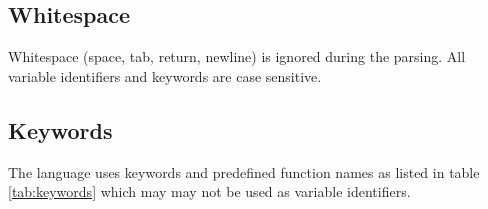 \ifdefined\STModuleDoc
\newcommand{\stsubsection}{\subsection}
\else
\newcommand{\stsubsection}{\subsection*}
\fi

\stsubsection{Whitespace}

Whitespace (space, tab, return, newline) is ignored during the parsing. All variable identifiers and keywords are case
sensitive.

\stsubsection{Keywords}\label{keywords}

The language uses keywords and predefined function names as listed in table \ref{tab:keywords} which may may not be used as
variable identifiers.

